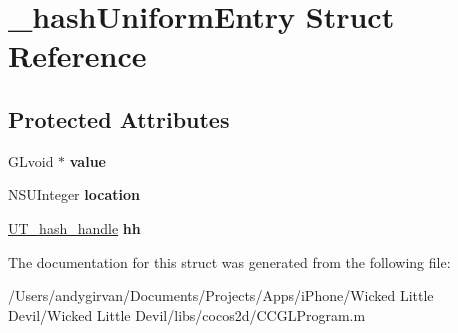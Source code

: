 \hypertarget{struct__hash_uniform_entry}{\section{\-\_\-hash\-Uniform\-Entry Struct Reference}
\label{struct__hash_uniform_entry}
}
\subsection*{Protected Attributes}
\begin{DoxyCompactItemize}
\item 
\hypertarget{struct__hash_uniform_entry_af32eb982cbde16d17ce4154fd1077b9e}{G\-Lvoid $\ast$ {\bfseries value}}\label{struct__hash_uniform_entry_af32eb982cbde16d17ce4154fd1077b9e}

\item 
\hypertarget{struct__hash_uniform_entry_aae5a6da9bd8cc820ce6ad8b4532cc7a1}{N\-S\-U\-Integer {\bfseries location}}\label{struct__hash_uniform_entry_aae5a6da9bd8cc820ce6ad8b4532cc7a1}

\item 
\hypertarget{struct__hash_uniform_entry_a5403836134444667c5285e8ae28231bd}{\hyperlink{struct_u_t__hash__handle}{U\-T\-\_\-hash\-\_\-handle} {\bfseries hh}}\label{struct__hash_uniform_entry_a5403836134444667c5285e8ae28231bd}

\end{DoxyCompactItemize}


The documentation for this struct was generated from the following file\-:\begin{DoxyCompactItemize}
\item 
/\-Users/andygirvan/\-Documents/\-Projects/\-Apps/i\-Phone/\-Wicked Little Devil/\-Wicked Little Devil/libs/cocos2d/C\-C\-G\-L\-Program.\-m\end{DoxyCompactItemize}
